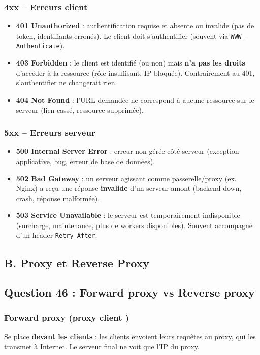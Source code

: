 \documentclass[12pt,a4paper]{article}
\begin{document}
\subsubsection*{4xx -- Erreurs client}
\begin{itemize}
  \item \textbf{401 Unauthorized} : authentification requise et absente ou invalide (pas de token, identifiants erron\'es). Le client doit s'authentifier (souvent via \texttt{WWW-Authenticate}).
  \item \textbf{403 Forbidden} : le client est identifi\'e (ou non) mais \textbf{n'a pas les droits} d'acc\'eder \`a la ressource (r\^ole insuffisant, IP bloqu\'ee). Contrairement au 401, s'authentifier ne changerait rien.
  \item \textbf{404 Not Found} : l'URL demand\'ee ne correspond \`a aucune ressource sur le serveur (lien cass\'e, ressource supprim\'ee).
\end{itemize}

\subsubsection*{5xx -- Erreurs serveur}
\begin{itemize}
  \item \textbf{500 Internal Server Error} : erreur non g\'er\'ee c\^ot\'e serveur (exception applicative, bug, erreur de base de donn\'ees).
  \item \textbf{502 Bad Gateway} : un serveur agissant comme passerelle/proxy (ex. Nginx) a re\c{c}u une r\'eponse \textbf{invalide} d'un serveur amont (backend down, crash, r\'eponse malform\'ee).
  \item \textbf{503 Service Unavailable} : le serveur est temporairement indisponible (surcharge, maintenance, plus de workers disponibles). Souvent accompagn\'e d'un header \texttt{Retry-After}.
\end{itemize}

\subsection*{B. Proxy et Reverse Proxy}
\subsection*{Question 46 : Forward proxy vs Reverse proxy}

\subsubsection*{Forward proxy (proxy \og client \fg)}
Se place \textbf{devant les clients} : les clients envoient leurs requ\^etes au proxy, qui les transmet \`a Internet. Le serveur final ne voit que l'IP du proxy.
\end{document}
